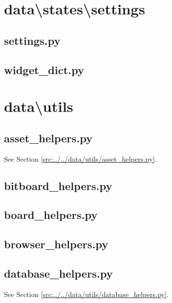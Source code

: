 \documentclass[../main/main.tex]{subfiles}
\begin{document}
\section{data\textbackslash states\textbackslash settings}
\subsection{settings.py}

\label{src:data/states/settings/settings.py}

\subsection{widget\_dict.py}

\label{src:data/states/settings/widget_dict.py}

\section{data\textbackslash utils}
\subsection{asset\_helpers.py}
See Section \ref{src:../../data/utils/asset_helpers.py}.

\subsection{bitboard\_helpers.py}

\label{src:data/utils/bitboard_helpers.py}

\subsection{board\_helpers.py}

\label{src:data/utils/board_helpers.py}

\subsection{browser\_helpers.py}

\label{src:data/utils/browser_helpers.py}

\subsection{database\_helpers.py}
See Section \ref{src:../../data/utils/database_helpers.py}.
\end{document}
